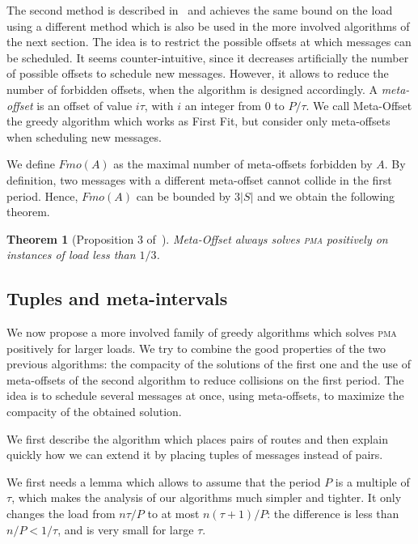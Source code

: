 \documentclass[10pt, conference, letterpaper]{IEEEtran}
\newtheorem{theorem}{Theorem}
\newcommand\pma{\textsc{pma}\xspace}
\begin{document}
The second method is described  in~\cite{barth2018deterministic} and achieves the same bound on the load using a different method which is also be used in the more involved algorithms
of the next section.
The idea is to restrict the possible offsets at which messages can be scheduled. It seems counter-intuitive, since it decreases artificially the number of possible offsets to schedule new messages. However, it allows to reduce the number of forbidden offsets, when the algorithm is designed accordingly. A \emph{meta-offset} is an offset of value $i\tau$,
with $i$ an integer from $0$ to $P / \tau$. We call Meta-Offset the greedy algorithm
which works as First Fit, but consider only meta-offsets when scheduling new messages. 

We define $Fmo(A)$ as the maximal number of meta-offsets forbidden by $A$. 
 By definition, two messages with a different meta-offset cannot collide in the first period.
Hence, $Fmo(A)$ can be bounded by $3|S|$ and we obtain the following theorem.


\begin{theorem}[Proposition 3 of~\cite{barth2018deterministic}]
Meta-Offset always solves \pma positively on instances of load less than
$1/3$.
\end{theorem}

\subsection{Tuples and meta-intervals}

We now propose a more involved family of greedy algorithms which 
solves \pma positively for larger loads. We try to combine the good properties of the two previous algorithms: the compacity of the solutions of the first one and the use of meta-offsets of the second algorithm to reduce collisions on the first period.
The idea is to schedule several messages at once, using meta-offsets, to maximize the compacity of the obtained solution. 


We first describe the algorithm which places pairs of routes and then explain quickly how we can extend it by placing tuples of messages instead of pairs.

We first needs a lemma which allows to assume that the period $P$ is a multiple of $\tau$, 
which makes the analysis of our algorithms much simpler and tighter. It only changes the load
from $n \tau / P$ to at most $n (\tau +1)/ P$: the difference is less than $n /P < 1/\tau$,
and is very small for large $\tau$.
\end{document}
